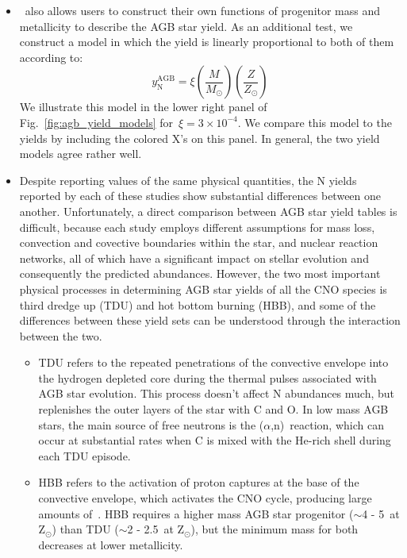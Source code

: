 \documentclass[ms.tex]{subfiles}
\begin{document}
\begin{itemize}
	\item \vice~also allows users to construct their own functions of 
	progenitor mass and metallicity to describe the AGB star yield. 
	As an additional test, we construct a model in which the yield is linearly 
	proportional to both of them according to: 
	\begin{equation} 
	y_\text{N}^\text{AGB} = \xi\left(\frac{M}{M_\odot}\right) 
	\left(\frac{Z}{Z_\odot}\right) 
	\label{eq:linear_yield} 
	\end{equation} 
	We illustrate this model in the lower right panel of 
	Fig.~\ref{fig:agb_yield_models} for~$\xi = 3\times10^{-4}$. 
	We compare this model to the~\citet{Cristallo2011, Cristallo2015} yields by 
	including the colored X's on this panel. 
	In general, the two yield models agree rather well. 

	\item Despite reporting values of the same physical quantities, the N 
	yields reported by each of these studies show substantial differences 
	between one another. 
	Unfortunately, a direct comparison between AGB star yield tables is 
	difficult, because each study employs different assumptions for mass loss, 
	convection and covective boundaries within the star, and nuclear reaction 
	networks, all of which have a significant impact on stellar evolution and 
	consequently the predicted abundances. 
	However, the two most important physical processes in determining AGB star 
	yields of all the CNO species is third dredge up (TDU) and hot bottom 
	burning (HBB), and some of the differences between these yield sets can be 
	understood through the interaction between the two. 
	\begin{itemize} 
		\item TDU refers to the repeated penetrations of the convective 
		envelope into the hydrogen depleted core during the thermal pulses 
		associated with AGB star evolution. 
		This process doesn't affect N abundances much, but replenishes the 
		outer layers of the star with C and O. 
		In low mass AGB stars, the main source of free neutrons is the 
		\Cthirteen($\alpha$,n)\Osixteen~reaction, which can occur at 
		substantial rates when C is mixed with the He-rich shell during each 
		TDU episode. 

		\item HBB refers to the activation of proton captures at the base of 
		the convective envelope, which activates the CNO cycle, producing large 
		amounts of~\Nfourteen. HBB requires a higher mass AGB star progenitor 
		($\sim$4 - 5~\msun at Z$_\odot$) than TDU ($\sim$2 - 2.5~\msun at 
		Z$_\odot$), but the minimum mass for both decreases at lower 
		metallicity. 


\end{itemize}
\end{itemize}
\end{document}
